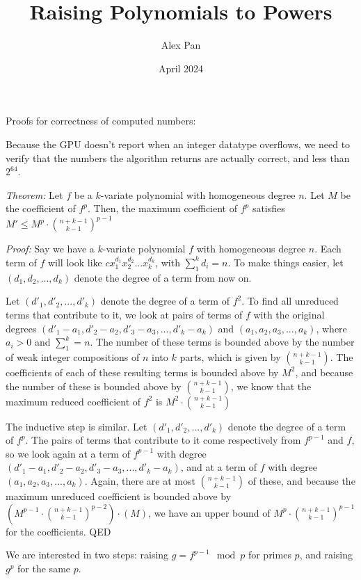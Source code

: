 \documentclass{article}
\title{Raising Polynomials to Powers}
\author{Alex Pan}
\date{April 2024}
\begin{document}
\maketitle

Proofs for correctness of computed numbers:

Because the GPU doesn't report when an integer datatype overflows, we need to verify that the numbers the algorithm returns are actually correct, and less than $2^64$.

\textit{Theorem: } Let $f$ be a $k$-variate polynomial with homogeneous degree $n$. Let $M$ be the coefficient of $f^p$. Then, the maximum coefficient of $f^p$ satisfies $M' \le M^p \cdot \binom{n + k - 1}{k - 1}^{p-1}$

\textit{Proof: } Say we have a $k$-variate polynomial $f$ with homogeneous degree $n$. Each term of $f$ will look like $cx_{1}^{d_1}x_{2}^{d_2}...x_{k}^{d_k}$, with $ \sum_{1}^{k} d_i = n$. To make things easier, let $(d_1, d_2, ... , d_k)$ denote the degree of a term from now on.

Let $(d'_1, d'_2, ... , d'_k)$ denote the degree of a term of $f^2$. To find all unreduced terms that contribute to it, we look at pairs of terms of $f$ with the original degrees $(d'_1 - a_1, d'_2 - a_2, d'_3 - a_3, ... , d'_k - a_k)$ and $(a_1, a_2, a_3, ... , a_k)$, where $a_i > 0$ and $\sum_{1}^{k} = n$. The number of these terms is bounded above by the number of weak integer compositions of $n$ into $k$ parts, which is given by $\binom{n + k - 1}{k - 1}$. The coefficients of each of these resulting terms is bounded above by $M^2$, and because the number of these is bounded above by $\binom{n + k - 1}{k - 1}$, we know that the maximum reduced coefficient of $f^2$ is $M^2 \cdot \binom{n + k - 1}{k - 1}$

The inductive step is similar. Let $(d'_1, d'_2, ... , d'_k)$ denote the degree of a term of $f^p$. The pairs of terms that contribute to it come respectively from $f^{p - 1}$ and $f$, so we look again at a term of $f^{p - 1}$ with degree $(d'_1 - a_1, d'_2 - a_2, d'_3 - a_3, ... , d'_k - a_k)$, and at a term of $f$ with degree $(a_1, a_2, a_3, ... , a_k)$. Again, there are at most $\binom{n + k - 1}{k - 1}$ of these, and because the maximum unreduced coefficient is bounded above by $\left(M^{p - 1} \cdot \binom{n + k - 1}{k - 1} ^ {p - 2}\right) \cdot (M)$, we have an upper bound of $M^p \cdot \binom{n + k - 1}{k - 1}^{p-1}$ for the coefficients. QED

We are interested in two steps: raising $g = f^{p - 1}\mod p$ for primes $p$, and raising $g ^ p$ for the same $p$.
\end{document}
